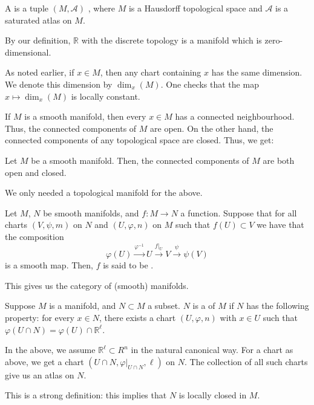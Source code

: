 \documentclass[12pt]{article}
\begin{document}
\begin{defn}
	A  is a tuple $(M, \mathcal{A})$ , where $M$ is a Hausdorff topological space and $\mathcal{A}$ is a saturated atlas on $M$.
\end{defn}
By our definition, $\mathbb{R}$ with the discrete topology is a manifold which is zero-dimensional.

As noted earlier, if $x \in M$, then any chart containing $x$ has the same dimension. 
We denote this dimension by $\dim_{x}(M)$. 
One checks that the map $x \mapsto \dim_{x}(M)$ is locally constant. 

If $M$ is a smooth manifold, then every $x \in M$ has a connected neighbourhood. 
Thus, the connected components of $M$ are open. 
On the other hand, the connected components of any topological space are closed. Thus, we get:

\begin{thm} \label{thm:manifold-components-clopen}
	Let $M$ be a smooth manifold. Then, the connected components of $M$ are both open and closed.
\end{thm}
We only needed a topological manifold for the above.

Let $M$, $N$ be smooth manifolds, and $f \colon M \to N$ a function. 
Suppose that for all charts $(V, \psi, m)$ on $N$ and $(U, \varphi, n)$ on $M$ such that $f(U) \subset V$ we have that the composition
\begin{equation*} 
	\varphi(U) \xrightarrow{\varphi^{-1}} U \xrightarrow{f|_{U}} V \xrightarrow{\psi} \psi(V)
\end{equation*}
is a smooth map. 
Then, $f$ is said to be .

This gives us the category of (smooth) manifolds.

\begin{defn} \label{defn:submanifold}
	Suppose $M$ is a manifold, and $N \subset M$ a subset. $N$ is a  of $M$ if $N$ has the following property: for every $x \in N$, there exists a chart $(U, \varphi, n)$ with $x \in U$ such that $\varphi(U \cap N) = \varphi(U) \cap \mathbb{R}^{\ell}$. 
\end{defn}
\begin{rem} \label{rem:submanifold}
	In the above, we assume $\mathbb{R}^{\ell} \subset R^{n}$ in the natural canonical way. \newline
	For a chart as above, we get a chart $(U \cap N, \varphi|_{U \cap N}, \ell)$ on $N$. 
	The collection of all such charts give us an atlas on $N$.

	This is a strong definition: this implies that $N$ is locally closed in $M$.
\end{rem}
\end{document}
